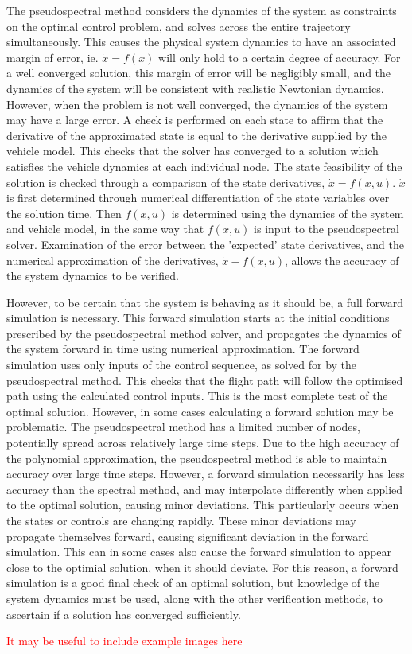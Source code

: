 The pseudospectral method considers the dynamics of the system as constraints on the optimal control problem, and solves across the entire trajectory simultaneously. This causes the physical system dynamics to have an associated margin of error, ie. $\dot{x} = f(x)$ will only hold to a certain degree of accuracy. For a well converged solution, this margin of error will be negligibly small, and the dynamics of the system will be consistent with realistic Newtonian dynamics. However, when the problem is not well converged, the dynamics of the system may have a large error.
A check is performed on each state to affirm that the derivative of the approximated state is equal to the derivative supplied by the vehicle model. This checks that the solver has converged to a solution which satisfies the vehicle dynamics at each individual node. 
The state feasibility of the solution is checked through a comparison of the state derivatives, $\dot{x} = f(x,u)$. $\dot{x}$ is first determined through numerical differentiation of the state variables over the solution time. Then $f(x,u)$ is determined using the dynamics of the system and vehicle model, in the same way that $f(x,u)$ is input to the pseudospectral solver. Examination of the error between the 'expected' state derivatives, and the numerical approximation of the derivatives, $\dot{x} - f(x,u)$, allows the accuracy of the system dynamics to be verified. 



 However, to be certain that the system is behaving as it should be, a full forward simulation is necessary. This forward simulation starts at the initial conditions prescribed by the pseudospectral method solver, and propagates the dynamics of the system forward in time using numerical approximation. The forward simulation uses only inputs of the control sequence, as solved for by the pseudospectral method. 
This checks that the flight path will follow the optimised path using the calculated control inputs. This is the most complete test of the optimal solution. However, in some cases calculating a forward solution may be problematic. The pseudospectral method has a limited number of nodes, potentially spread across relatively large time steps. Due to the high accuracy of the polynomial approximation, the pseudospectral method is able to maintain accuracy over large time steps. However, a forward simulation necessarily has less accuracy than the spectral method, and may interpolate differently when applied to the optimal solution, causing minor deviations. This particularly occurs when the states or controls are changing rapidly. These minor deviations may propagate themselves forward, causing significant deviation in the forward simulation. This can in some cases also cause the forward simulation to appear close to the optimial solution, when it should deviate. For this reason, a forward simulation is a good final check of an optimal solution, but knowledge of the system dynamics must be used, along with the other verification methods, to ascertain if a solution has converged sufficiently. 

\textcolor{red}{It may be useful to include example images here}

